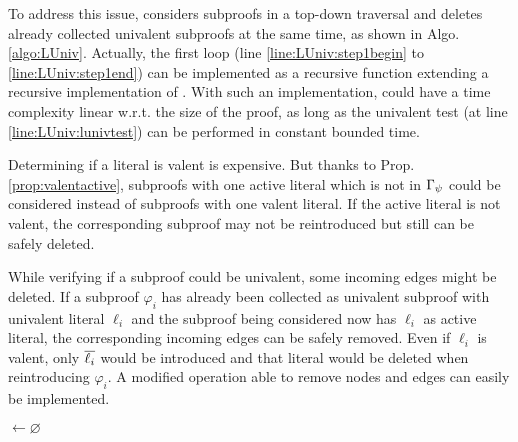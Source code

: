 \documentclass{llncs}
\begin{document}
To address this issue, {\LowerUnivalents} considers subproofs in a top-down traversal and deletes
already collected univalent subproofs at the same time, as shown in Algo. \ref{algo:LUniv}.
Actually, the first loop (line \ref{line:LUniv:step1begin} to \ref{line:LUniv:step1end}) can be
implemented as a recursive function extending a recursive implementation of . With
such an implementation, {\LowerUnivalents} could have a time complexity linear w.r.t. the size of
the proof, as long as the univalent test (at line \ref{line:LUniv:lunivtest}) can be performed in
constant bounded time.

Determining if a literal is valent is expensive. But thanks to Prop. \ref{prop:valentactive},
subproofs with one active literal which is not in $\Gamma_{\psi}$ could be considered instead
of subproofs with one valent literal.  If the active literal is not valent, the corresponding
subproof may not be reintroduced but still can be safely deleted.

While verifying if a subproof could be univalent, some incoming edges might be deleted. If a
subproof $\varphi_i$ has already been collected as univalent subproof with univalent literal
$\ell_i$ and the subproof being considered now has $\ell_i$ as active literal, the corresponding
incoming edges can be safely removed. Even if $\ell_i$ is valent, only $\overline{\ell_i}$ would be
introduced and that literal would be deleted when reintroducing $\varphi_i$. A modified
 operation able to remove nodes and edges can easily be implemented.

\begin{algorithm}[bt]
  \BlankLine

  \Activ $\leftarrow \varnothing$ \;
  \BlankLine

  \BlankLine


  \caption[.]{}
  \label{algo:isUniv}
\end{algorithm}
\end{document}
